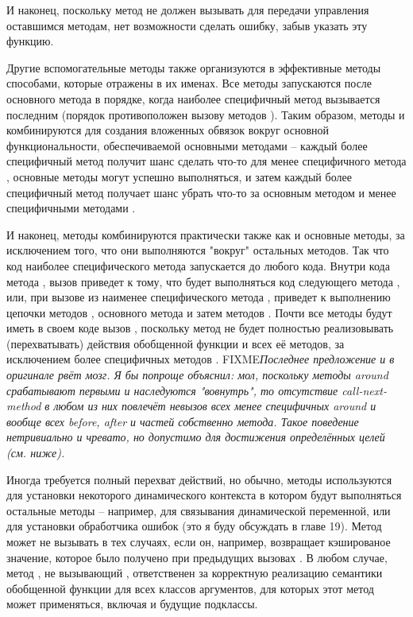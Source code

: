 И наконец, поскольку метод  не должен вызывать  для
передачи управления оставшимся методам, нет возможности сделать ошибку, забыв указать эту
функцию.

Другие вспомогательные методы также организуются в эффективные методы способами, которые
отражены в их именах.  Все методы  запускаются после основного метода в
порядке, когда наиболее специфичный метод вызывается последним (порядок противоположен
вызову методов ).  Таким образом, методы  и 
комбинируются для создания вложенных обвязок вокруг основной функциональности,
обеспечиваемой основными методами -- каждый более специфичный метод  получит
шанс сделать что-то для менее специфичного метода , основные методы могут
успешно выполняться, и затем каждый более специфичный метод  получает шанс
убрать что-то за основным методом и менее специфичными методами .

И наконец, методы  комбинируются практически также как и основные методы, за
исключением того, что они выполняются "вокруг" остальных методов. Так что код наиболее
специфического метода  запускается до любого кода. Внутри кода метода
, вызов  приведет к тому, что будет выполняться код
следующего метода , или, при вызове из наименее специфического метода
, приведет к выполнению цепочки методов , основного метода и
затем методов .  Почти все методы  будут иметь в своем коде
вызов , поскольку метод  не будет полностью
реализовывать (перехватывать) действия обобщенной функции и всех её методов, за
исключением более специфичных методов . FIXME\textit{Последнее предложение и
  в оригинале рвёт мозг. Я бы попроще объяснил: мол, поскольку методы around срабатывают
  первыми и наследуются "вовнутрь", то отсутствие call-next-method в любом из них повлечёт
  невызов всех менее специфичных around и вообще всех before, after и частей собственно
  метода. Такое поведение нетривиально и чревато, но допустимо для достижения определённых
  целей (см. ниже).}

Иногда требуется полный перехват действий, но обычно, методы  используются
для установки некоторого динамического контекста в котором будут выполняться остальные
методы -- например, для связывания динамической переменной, или для установки обработчика
ошибок (это я буду обсуждать в главе 19).  Метод  может не вызывать
 в тех случаях, если он, например, возвращает кэшированое значение,
которое было получено при предыдущих вызовах .  В любом случае,
метод , не вызывающий , ответственен за корректную
реализацию семантики обобщенной функции для всех классов аргументов, для которых этот
метод может применяться, включая и будущие подклассы.

